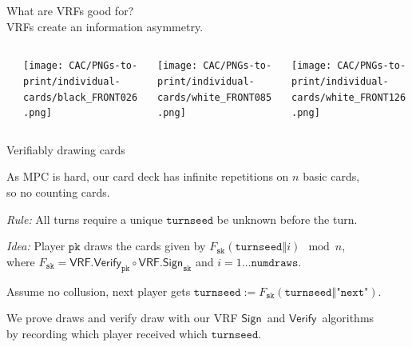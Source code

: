 \documentclass[fleqn,xcolor={usenames,dvipsnames},notes,aspectratio=169]{beamer} %
\newcommand{\algo}[1]{\ensuremath{\mathsf{#1}}}
\newcommand{\VRF}{\algo{VRF}}
\newcommand{\Sign}{\algo{Sign}}
\newcommand{\Verify}{\algo{Verify}}
\newcommand{\var}[1]{\ensuremath{\mathtt{#1}}}
\newcommand{\sk}{\var{sk}}
\newcommand{\pk}{\var{pk}}
\newcommand{\turnseed}{\var{turnseed}}
\newcommand\concatvert{\mathbin\Vert}
\begin{document}
\begin{frame} %

\medskip

What are VRFs good for? \\
\hspace*{140pt} VRFs create an information asymmetry.

\bigskip\medskip

\begin{columns}
\begin{column}[t]{0.1\textwidth}
\end{column}
\begin{column}[t]{0.3\textwidth}
\texttt{[image: CAC/PNGs-to-print/individual-cards/black\_FRONT026.png]}
\end{column}
\begin{column}[t]{0.3\textwidth}
\texttt{[image: CAC/PNGs-to-print/individual-cards/white\_FRONT085.png]}
\end{column}
\begin{column}[t]{0.3\textwidth}
\texttt{[image: CAC/PNGs-to-print/individual-cards/white\_FRONT126.png]}
\end{column}
\end{columns}   

\end{frame}



\begin{frame}{Verifiably drawing cards}


As MPC is hard, our card deck has infinite repetitions on $n$ basic cards, \\
\hspace*{10pt} so no counting cards. 

\bigskip
\bigskip

{\em Rule:} All turns require a unique $\turnseed$ be unknown before the turn. \\ 

\bigskip

{\em Idea:} Player $\pk$ draws the cards given by $F_\sk(\turnseed \concatvert i) \mod n$, \\
\hspace*{10pt} where $F_\sk = \VRF.\Verify_\pk \circ \VRF.\Sign_\sk$ and $i=1 \ldots \var{numdraws}$.

\pause
\bigskip

Assume no collusion, next player gets $\turnseed := F_\sk(\turnseed \concatvert \texttt{"next"})$.

\bigskip

We prove draws and verify draw with our VRF \Sign\ and \Verify\ algorithms \\
\hspace*{10pt} by recording which player received which $\turnseed$.

\end{frame}
\end{document}
